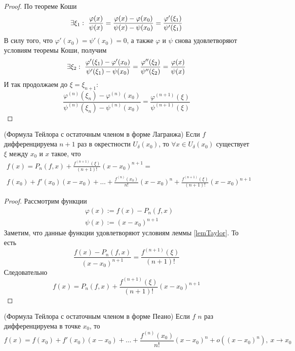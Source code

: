 \begin{proof}
	По теореме Коши
	\[
		\exists \xi_1 :\  \frac{\varphi(x)}{\psi(x)} =
		\frac{\varphi(x) - \varphi(x_0)}{\psi(x) - \psi(x_0)} =
		\frac{\varphi'(\xi_1)}{\psi'(\xi_1)}
	\]
	В силу того, что $\varphi'(x_0) = \psi'(x_0) = 0$, а также
	$\varphi$ и $\psi$ снова удовлетворяют условиям теоремы
	Коши, получим
	\[
		\exists \xi_2 :\  \frac{\varphi'(\xi_1) -
		\varphi'(x_0)}{\psi'(\xi_1) - \psi(x_0)} =
		\frac{\varphi''(\xi_2)}{\psi''(\xi_2)} =
		\frac{\varphi(x)}{\psi(x)}
	\]
	И так продолжаем до $\xi = \xi_{n + 1}$:
	\[
		\frac{\varphi^{(n)}(\xi_n) - \varphi^{(n)}(x_0)}
		{\psi^{(n)}(\xi_n) - \psi^{(n)}(x_0)} =
		\frac{\varphi^{(n + 1)}(\xi)}{\psi^{(n + 1)}(\xi)}
	\]
\end{proof}

\begin{theorem} (Формула Тейлора с остаточным членом в
	форме Лагранжа)
	Если $f$ дифференцируема $n + 1$ раз в окрестности
	$U_\delta(x_0)$, то $\forall x \in U_\delta(x_0)$
	существует $\xi$ между $x_0$ и $x$ такое, что
	\begin{multline*}
		f(x) = P_n(f, x) +
		\frac{f^{(n + 1)}(\xi)}{(n + 1)!}(x - x_0)^{n + 1} = \\
		f(x_0) + f'(x_0)(x - x_0) + \ldots +
		\frac{f^{(n)}(x_0)}{n!}(x - x_0)^n +
		\frac{f^{(n + 1)} (\xi)}{(n + 1)!}(x - x_0)^{n + 1}
	\end{multline*}
\end{theorem}

\begin{proof}
	Рассмотрим функции
	\begin{align*}
		&\varphi(x) := f(x) - P_n(f, x)
		\\
		&\psi(x) := (x - x_0)^{n + 1}
	\end{align*}
	Заметим, что данные функции удовлетворяют условиям
	леммы \ref{lemTaylor}. То есть
	\[
		\frac{f(x) - P_n(f, x)}{(x - x_0)^{n + 1}} =
		\frac{f^{(n + 1)}(\xi)}{(n + 1)!}
	\]
	Следовательно
	\[
		f(x) = P_n(f, x) + \frac{f^{(n + 1)}(\xi)}
		{(n + 1)!}(x - x_0)^{n + 1}
	\]
\end{proof}

\begin{theorem} (Формула Тейлора с остаточным членом в
	форме Пеано)
	Если $f$ $n$ раз дифференцируема в точке $x_0$, то
	\[
		f(x) = f(x_0) + f'(x_0)(x - x_0) + \ldots +
		\frac{f^{(n)}(x_0)}{n!}(x - x_0)^n +
		o\left((x - x_0)^n\right),\ x \to x_0
	\]
\end{theorem}

